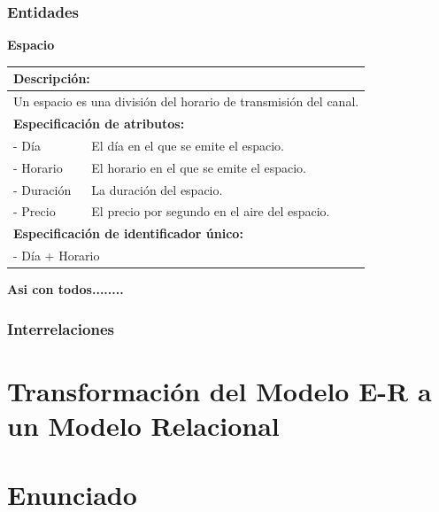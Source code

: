 \documentclass[a4paper,10pt]{article}
\begin{document}
    \subsubsection{Entidades}
    \begin{flushleft}
      \begin{large} \bf{Espacio} \end{large}
    \end{flushleft}
      \begin{tabular}{| p{2cm} | p{9cm} |}
	\hline
	\multicolumn{2}{|l|}{\bf{Descripci\'on:}} \\
	\hline
	\multicolumn{2}{|l|}{Un espacio es una divisi\'on del horario de transmisi\'on del canal.} \\
	\hline	
	\multicolumn{2}{|l|}{\bf{Especificaci\'on de atributos:}} \\
	\hline
	- D\'ia & El d\'ia en el que se emite el espacio. \\
	\hline \hline
	- Horario & El horario en el que se emite el espacio. \\
	\hline \hline
	- Duraci\'on & La duraci\'on del espacio.\\
	\hline \hline
	- Precio & El precio por segundo en el aire del espacio.\\
	\hline
	\multicolumn{2}{|l|}{\bf{Especificaci\'on de identificador \'unico:}} \\
	\hline
	\multicolumn{2}{|l|}{- D\'ia + Horario} \\
	\hline
      \end{tabular}

    \begin{flushleft}
      \begin{large} \bf{Asi con todos........} \end{large}
    \end{flushleft}
   
    \subsubsection{Interrelaciones}


\newpage
\section{Transformaci\'on del Modelo E-R a un Modelo Relacional}

\appendix
\newpage
\section{Enunciado}

\end{document}
